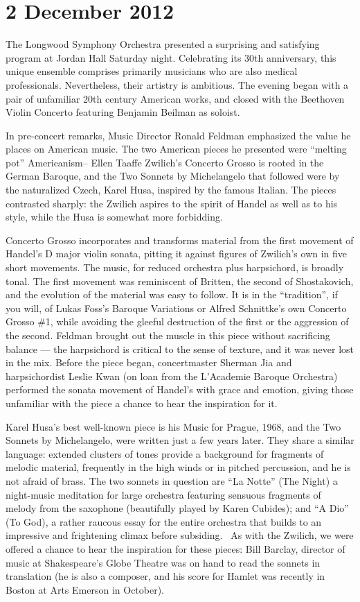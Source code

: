 
\chapter{2 December 2012}

The Longwood Symphony Orchestra presented a surprising and satisfying program at Jordan Hall Saturday night. Celebrating its 30th anniversary, this unique ensemble comprises primarily musicians who are also medical professionals. Nevertheless, their artistry is ambitious. The evening began with a pair of unfamiliar 20th century American works, and closed with the Beethoven Violin Concerto featuring Benjamin Beilman as soloist.

In pre-concert remarks, Music Director Ronald Feldman emphasized the value he places on American music. The two American pieces he presented were “melting pot” Americanism– Ellen Taaffe Zwilich’s Concerto Grosso is rooted in the German Baroque, and the Two Sonnets by Michelangelo that followed were by the naturalized Czech, Karel Husa, inspired by the famous Italian. The pieces contrasted sharply: the Zwilich aspires to the spirit of Handel as well as to his style, while the Husa is somewhat more forbidding.

Concerto Grosso incorporates and transforms material from the first movement of Handel’s D major violin sonata, pitting it against figures of Zwilich’s own in five short movements. The music, for reduced orchestra plus harpsichord, is broadly tonal. The first movement was reminiscent of Britten, the second of Shostakovich, and the evolution of the material was easy to follow. It is in the “tradition”, if you will, of Lukas Foss’s Baroque Variations or Alfred Schnittke’s own Concerto Grosso \#1, while avoiding the gleeful destruction of the first or the aggression of the second. Feldman brought out the muscle in this piece without sacrificing balance — the harpsichord is critical to the sense of texture, and it was never lost in the mix. Before the piece began, concertmaster Sherman Jia and harpsichordist Leslie Kwan (on loan from the L’Academie Baroque Orchestra) performed the sonata movement of Handel’s with grace and emotion, giving those unfamiliar with the piece a chance to hear the inspiration for it.

Karel Husa’s best well-known piece is his Music for Prague, 1968, and the Two Sonnets by Michelangelo, were written just a few years later. They share a similar language: extended clusters of tones provide a background for fragments of melodic material, frequently in the high winds or in pitched percussion, and he is not afraid of brass. The two sonnets in question are “La Notte” (The Night) a night-music meditation for large orchestra featuring sensuous fragments of melody from the saxophone (beautifully played by Karen Cubides); and “A Dio” (To God), a rather raucous essay for the entire orchestra that builds to an impressive and frightening climax before subsiding.  As with the Zwilich, we were offered a chance to hear the inspiration for these pieces: Bill Barclay, director of music at Shakespeare's Globe Theatre was on hand to read the sonnets in translation (he is also a composer, and his score for Hamlet was recently in Boston at Arts Emerson in October).

